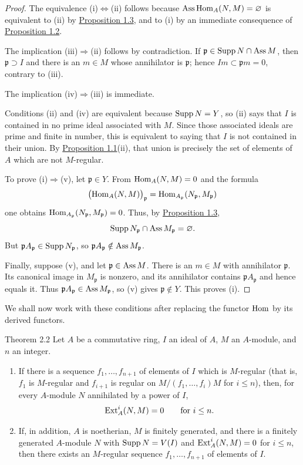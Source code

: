 \begin{proof}
The equivalence (i)$\Leftrightarrow$(ii) follows because
$\operatorname{Ass}\operatorname{Hom}_A(N,M)=\varnothing$ is equivalent to (ii) by \hyperref[III.1.3]{Proposition 1.3},
and to (i) by an immediate consequence of \hyperref[III.1.2]{Proposition 1.2}.

The implication (iii)$\Rightarrow$(ii) follows by contradiction. If
$\mathfrak p\in\operatorname{Supp} N\cap\operatorname{Ass} M$, then $\mathfrak p\supset I$ and there
is an $m\in M$ whose annihilator is $\mathfrak p$; hence
$Im\subset\mathfrak p m=0$, contrary to (iii).

The implication (iv)$\Rightarrow$(iii) is immediate.

Conditions (ii) and (iv) are equivalent because $\operatorname{Supp} N=Y$, so (ii) says
that $I$ is contained in no prime ideal associated with $M$. Since those
associated ideals are prime and finite in number, this is equivalent to
saying that $I$ is not contained in their union. By \hyperref[III.1.1]{Proposition 1.1}(ii),
that union is precisely the set of elements of $A$ which are not
$M$-regular.

To prove (i)$\Rightarrow$(v), let $\mathfrak p\in Y$. From
$\operatorname{Hom}_A(N,M)=0$ and the formula
\[
  \bigl(\operatorname{Hom}_A(N,M)\bigr)_{\mathfrak p}
  =\operatorname{Hom}_{A_{\mathfrak p}}(N_{\mathfrak p},M_{\mathfrak p})
\]
one obtains $\operatorname{Hom}_{A_{\mathfrak p}}(N_{\mathfrak p},M_{\mathfrak p})=0$.
Thus, by \hyperref[III.1.3]{Proposition 1.3},
\[
  \operatorname{Supp} N_{\mathfrak p}\cap\operatorname{Ass} M_{\mathfrak p}=\varnothing.
\]
But $\mathfrak pA_{\mathfrak p}\in\operatorname{Supp} N_{\mathfrak p}$, so
$\mathfrak pA_{\mathfrak p}\notin\operatorname{Ass} M_{\mathfrak p}$.

Finally, suppose (v), and let $\mathfrak p\in\operatorname{Ass} M$. There is an
$m\in M$ with annihilator $\mathfrak p$. Its canonical image in
$M_{\mathfrak p}$ is nonzero, and its annihilator contains
$\mathfrak pA_{\mathfrak p}$ and hence equals it. Thus
$\mathfrak pA_{\mathfrak p}\in\operatorname{Ass} M_{\mathfrak p}$, so (v) gives
$\mathfrak p\notin Y$. This proves (i).
\end{proof}

We shall now work with these conditions after replacing the
functor $\operatorname{Hom}$ by its derived functors.

\begin{sgastatement}{Theorem 2.2}
Let $A$ be a commutative ring, $I$ an ideal of $A$, $M$ an $A$-module, and
$n$ an integer.
\begin{enumerate}[label=\textup{(\alph*)},leftmargin=2.5em]
\item If there is a sequence $f_1,\ldots,f_{n+1}$ of elements of $I$ which
is $M$-regular (that is, $f_1$ is $M$-regular and $f_{i+1}$ is regular on
$M/(f_1,\ldots,f_i)M$ for $i\le n$), then, for every $A$-module $N$
annihilated by a power of $I$,
\[
  \operatorname{Ext}_A^i(N,M)=0\qquad\text{for }i\le n.
\]
\item If, in addition, $A$ is noetherian, $M$ is finitely generated, and
there is a finitely generated $A$-module $N$ with $\operatorname{Supp} N=V(I)$ and
$\operatorname{Ext}_A^i(N,M)=0$ for $i\le n$, then there exists an $M$-regular
sequence $f_1,\ldots,f_{n+1}$ of elements of $I$.
\end{enumerate}
\end{sgastatement}

